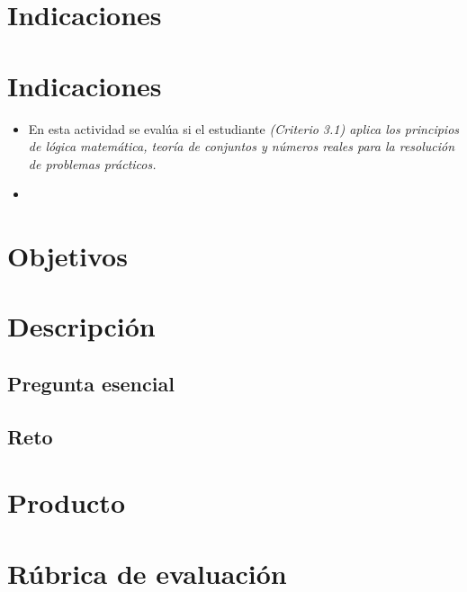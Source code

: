 \documentclass[a4,11pt]{aleph-notas}
\begin{document}
\encabezado

\vspace*{-10mm}
\section{Indicaciones}

\section*{Indicaciones}
\begin{itemize}[leftmargin=*]
\item 
    En esta actividad se evalúa si el estudiante \textit{(Criterio 3.1) aplica los principios de lógica matemática, teoría de conjuntos y números reales para la resolución de problemas prácticos.}
\item 
    
\end{itemize}


\section{Objetivos}


\section{Descripción}


\subsection{Pregunta esencial}


\subsection{Reto}


\section{Producto}



\section{Rúbrica de evaluación}
\end{document}
